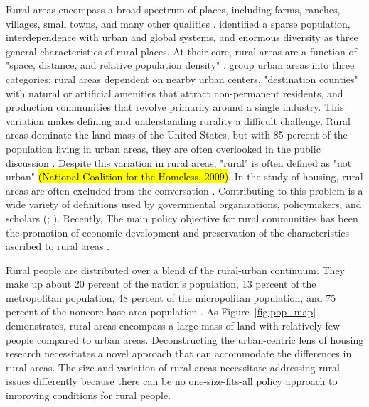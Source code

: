  Rural areas encompass a broad spectrum of places, including farms, ranches, villages, small towns, and many other qualities \citep{cromartie_defining_2008}. \citet{castle_conceptual_1998} identified a sparse population, interdependence with urban and global systems, and enormous diversity as three general characteristics of rural places.  At their core, rural areas are a function of "space, distance, and relative population density" \citep[?]{castle_place_2011}. \citet{shoup_principles_2010} group urban areas into three categories: rural areas dependent on nearby urban centers, "destination counties" with natural or artificial amenities that attract non-permanent residents, and production communities that revolve primarily around a single industry. This variation makes defining and understanding rurality a difficult challenge. Rural areas dominate the land mass of the United States, but with 85 percent of the population living in urban areas, they are often overlooked in the public discussion \citep{pendall_future_2016}. Despite this variation in rural areas,  "rural" is often defined as "not urban" 
 \hl{(National Coalition for the Homeless, 2009)}. In the study of housing, rural areas are often excluded from the conversation \citep{gkartzios_housing_2017}. Contributing to this problem is a wide variety of definitions used by governmental organizations, policymakers, and scholars (\citealp{yousey_defining_2018}; \citealp{cromartie_defining_2008}). Recently, The main policy objective for rural communities has been the promotion of economic development and preservation of the characteristics ascribed to rural areas \citep{lichter_changing_2007}. 

Rural people are distributed over a blend of the rural-urban continuum. They make up about 20 percent of the nation's population, 13 percent of the metropolitan population, 48 percent of the micropolitan population, and 75 percent of the noncore-base area population \citep{isserman_national_2005}. As Figure~\ref{fig:pop_map} demonstrates, rural areas encompass a large mass of land with relatively few people compared to urban areas. Deconstructing the urban-centric lens of housing research necessitates a novel approach that can accommodate the differences in rural areas. The size and variation of rural areas necessitate addressing rural issues differently because there can be no one-size-fits-all policy approach to improving conditions for rural people. 

